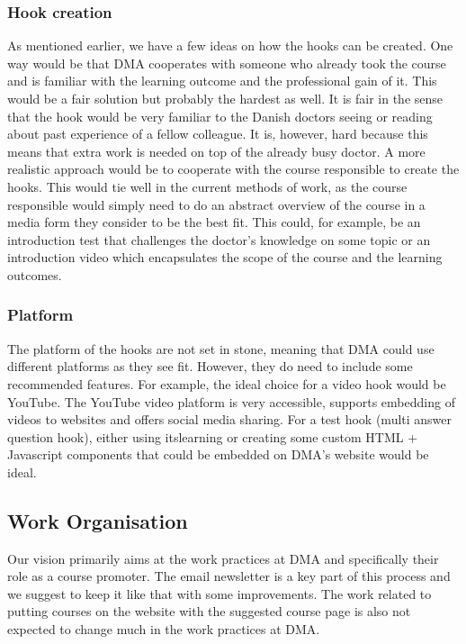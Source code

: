 \subsubsection{Hook creation}
As mentioned earlier, we have a few ideas on how the hooks can be created. One way would be that DMA cooperates with someone who already took the course and is familiar with the learning outcome and the professional gain of it. This would be a fair solution but probably the hardest as well. It is fair in the sense that the hook would be very familiar to the Danish doctors seeing or reading about past experience of a fellow colleague. It is, however, hard because this means that extra work is needed on top of the already busy doctor. A more realistic approach would be to cooperate with the course responsible to create the hooks. This would tie well in the current methods of work, as the course responsible would simply need to do an abstract overview of the course in a media form they consider to be the best fit. This could, for example, be an introduction test that challenges the doctor’s knowledge on some topic or an introduction video which encapsulates the scope of the course and the learning outcomes.

\subsubsection{Platform}
The platform of the hooks are not set in stone, meaning that DMA could use different platforms as they see fit. However, they do need to include some recommended features. For example, the ideal choice for a video hook would be YouTube. The YouTube video platform is very accessible, supports embedding of videos to websites and offers social media sharing. For a test hook (multi answer question hook), either using itslearning or creating some custom HTML + Javascript components that could be embedded on DMA’s website would be ideal.

\subsection{Work Organisation}
Our vision primarily aims at the work practices at DMA and specifically their role as a course promoter. The email newsletter is a key part of this process and we suggest to keep it like that with some improvements. The work related to putting courses on the website with the suggested course page is also not expected to change much in the work practices at DMA.

